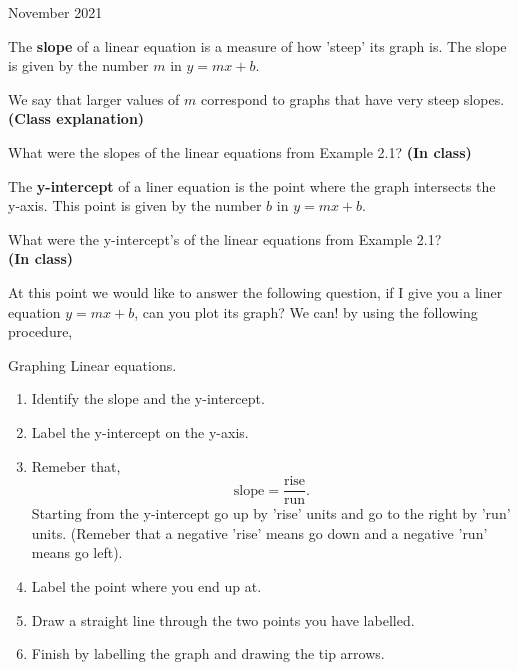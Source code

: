 \documentclass[12pt,oneside]{book} %
\begin{document}
\begin{lec}{November 2021}
	\begin{mdframed}
		\begin{defn}
			The \textbf{slope} of a linear equation is a measure of how 'steep' its graph is. The slope is given by the number $m$ in $y = mx + b$.
		\end{defn}
	\end{mdframed}
	We say that larger values of $m$ correspond to graphs that have very steep slopes.\\
	\textbf{(Class explanation)}
	\begin{ex}
		What were the slopes of the linear equations from Example 2.1? \textbf{(In class)}
	\end{ex}

	\vspace*{0.2cm}


	\begin{mdframed}
		\begin{defn}
			The \textbf{y-intercept} of a liner equation is the point where the graph intersects the y-axis. This point is given by the
			number $b$ in $y = mx + b$.
		\end{defn}
	\end{mdframed}

	\begin{ex}
		What were the y-intercept's of the linear equations from Example 2.1?\\ \textbf{(In class)}
	\end{ex}

	At this point we would like to answer the following question, if I give you a liner equation $y = mx + b$, can you plot its
	graph? We can! by using the following procedure,
	\newpage

	\begin{proc}
		Graphing Linear equations.
		\begin{enumerate}
			\item Identify the slope and the y-intercept.
			\item Label the y-intercept on the y-axis.
			\item Remeber that, \[
								\text{slope} = \frac{\text{rise}}{\text{run}}
			.\] Starting from the y-intercept go up by 'rise' units and go to the right by 'run' units. (Remeber that a negative 'rise' means go down and a
			negative 'run' means go left).
			\item Label the point where you end up at.
			\item Draw a straight line through the two points you have labelled.
			\item Finish by labelling the graph and drawing the tip arrows.
		\end{enumerate}
	\end{proc}


\end{lec}
\end{document}

